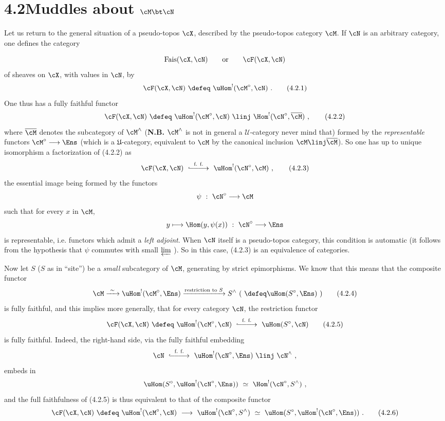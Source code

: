 \section*{4.2\quad Muddles about $\cM \bt \cN$}

Let us return to the general situation of a pseudo-topos $\cX$, described by the pseudo-topos category $\cM$. If $\cN$ is an arbitrary category, one defines the category

\[
\mathrm{Fais}(\cX,\cN) \qquad \text{or} \qquad \cF(\cX,\cN)
\]
of sheaves on $\cX$, with values in $\cN$, by
\[
\cF(\cX,\cN) \ \defeq\ \uHom^{!}(\cM^{\circ},\cN) \ .
\tag*{(4.2.1)}
\]
One thus has a fully faithful functor
\[
\cF(\cX,\cN) \ \defeq\ \uHom^{!}(\cM^{\circ},\cN) \ \linj\ \Hom^{!}(\cN^{\circ},\overline{\cM}) \ ,
\tag*{(4.2.2)}
\]
where $\overline{\cM}$ denotes the subcategory of $\cM^{\wedge}$ (\textbf{N.B.} $\cM^{\wedge}$ is not in general a $\mathcal{U}$-category never mind that) formed by the \textit{representable} functors $\cM^{\circ}\longrightarrow\Ens$ (which is a $\mathfrak{U}$-category, equivalent to $\cM$ by the canonical inclusion $\cM \linj \overline{\cM}$). So one has up to unique isomorphism a factorization of (4.2.2) as
\[
\cF(\cX,\cN) \ \overset{\text{f. f.}}{\lhook\joinrel\relbar\joinrel\relbar\joinrel\longrightarrow}\ \uHom^{!}(\cN^{\circ},\cM) \ ,
\tag*{(4.2.3)}
\]
the essential image being formed by the functors
\[
\psi \ :\ \cN^{\circ} \longrightarrow \cM
\]
such that for every $x$ in $\cM$,
\[
y \longmapsto \Hom(y,\psi(x)) \ :\ \cN^{\circ} \longrightarrow \Ens
\]
is representable, i.e. functors which
admit a \textit{left adjoint}. When $\cN$ itself is a pseudo-topos category, this condition is automatic (it follows from the hypothesis that $\psi$ commutes with small $\varprojlim$ ). So in this case, (4.2.3) is an equivalence of categories.

Now let $S$ ($S$ as in ``site'') be a \textit{small} subcategory of $\cM$, generating by strict epimorphisms. We know that this means that the composite functor
\[
\cM \xrightarrow{\ \sim\ } \uHom^{!}(\cM^{\circ},\Ens) \xrightarrow{\text{restriction to } S} S^{\wedge} \ (\ \defeq \uHom(S^{\circ},\Ens)\ )
\tag*{(4.2.4)}
\]
is fully faithful, and this implies more generally, that for every category $\cN$, the restriction functor
\[
\cF(\cX,\cN) \ \defeq\ \uHom^{!}(\cM^{\circ},\cN) \ \overset{\text{f. f.}}{\lhook\joinrel\relbar\joinrel\relbar\joinrel\longrightarrow}\ \uHom(S^{\circ},\cN)
\tag*{(4.2.5)}
\]
is fully faithful. Indeed, the right-hand side, via the fully faithful embedding
\[
\cN \ \overset{\text{f. f.}}{\lhook\joinrel\relbar\joinrel\relbar\joinrel\longrightarrow}\ \uHom^{!}(\cN^{\circ},\Ens) \ \linj\ \cN^{\wedge} \ ,
\]
embeds in
\[
\uHom(S^{\circ},\uHom^{!}(\cN^{\circ},\Ens)) \ \simeq\ \Hom^{!}(\cN^{\circ},S^{\wedge}) \ ,
\]
and the full faithfulness of (4.2.5) is thus equivalent to that of the composite functor
\[
\cF(\cX,\cN) \ \defeq\ \uHom^{!}(\cM^{\circ},\cN) \ \longrightarrow\ \uHom^{!}(\cN^{\circ},S^{\wedge}) \ \simeq\ \uHom(S^{\circ},\uHom^{!}(\cN^{\circ},\Ens)) \ .
\tag*{(4.2.6)}
\]

